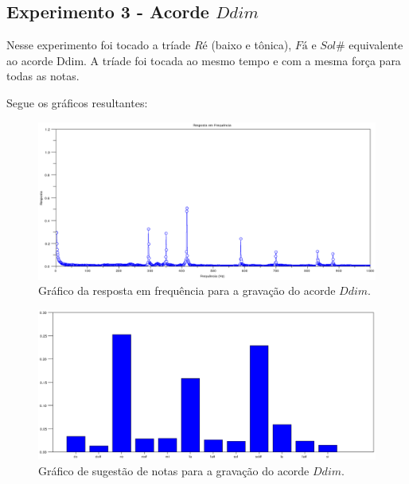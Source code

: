 \subsection{Experimento 3 - Acorde $Ddim$}
\label{sec:experimento3}

Nesse experimento foi tocado a tríade $Ré$ (baixo e tônica), $Fá$ e $Sol\#$ equivalente ao acorde Ddim. A tríade foi tocada ao mesmo tempo e com a mesma força para todas as notas.

Segue os gráficos resultantes:

\begin{figure}[h]
	\centering
		\includegraphics[keepaspectratio=true,scale=0.49]{figuras/Dm/fft_Ddim.eps}
	\caption{Gráfico da resposta em frequência para a gravação do acorde $Ddim$.}
  \label{fig:espectro_Ddim}
\end{figure}

\begin{figure}[h]
	\centering
		\includegraphics[keepaspectratio=true,scale=0.45]{figuras/Dm/notas_Ddim.eps}
	\caption{Gráfico de sugestão de notas para a gravação do acorde $Ddim$.}
  \label{fig:notas_Ddim}
\end{figure}

